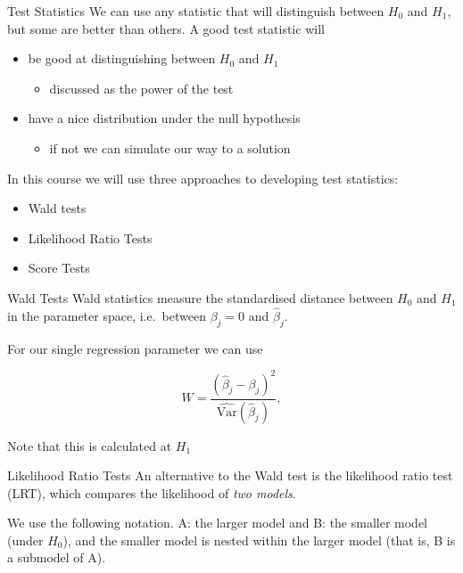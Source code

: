 \documentclass[
  ignorenonframetext,
]{beamer}
\providecommand{\tightlist}{%
  \setlength{\itemsep}{0pt}\setlength{\parskip}{0pt}}
\begin{document}
\begin{frame}{Test Statistics}
\label{test-statistics}
We can use any statistic that will distinguish between \(H_0\) and
\(H_1\), but some are better than others. A good test statistic will

\begin{itemize}
\tightlist
\item
  be good at distinguishing between \(H_0\) and \(H_1\)

  \begin{itemize}
  \tightlist
  \item
    discussed as the power of the test
  \end{itemize}
\item
  have a nice distribution under the null hypothesis

  \begin{itemize}
  \tightlist
  \item
    if not we can simulate our way to a solution
  \end{itemize}
\end{itemize}

In this course we will use three approaches to developing test
statistics:

\begin{itemize}
\tightlist
\item
  Wald tests
\item
  Likelihood Ratio Tests
\item
  Score Tests
\end{itemize}
\end{frame}

\begin{frame}{Wald Tests}
\label{wald-tests}
Wald statistics measure the standardised distance between \(H_0\) and
\(H_1\) in the parameter space, i.e.~between \(\beta_j=0\) and
\(\widehat{\beta}_j\).

For our single regression parameter we can use

\[
W=\frac{(\widehat{\beta}_j - \beta_j)^2}{\widehat{\text{Var}}(\widehat{\beta}_j)},
\]

Note that this is calculated at \(H_1\)
\end{frame}

\begin{frame}{Likelihood Ratio Tests}
\label{likelihood-ratio-tests}
An alternative to the Wald test is the likelihood ratio test (LRT),
which compares the likelihood of \emph{two models}.

We use the following notation. A: the larger model and B: the smaller
model (under \(H_0\)), and the smaller model is nested within the larger
model (that is, B is a submodel of A).
\end{frame}
\end{document}
